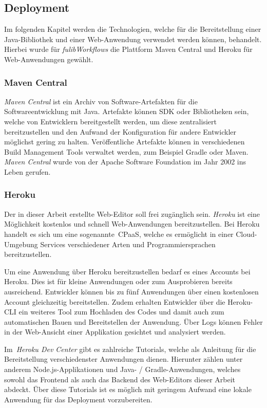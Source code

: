 \subsection{Deployment}\label{subsec:deployment}
Im folgenden Kapitel werden die Technologien, welche für die Bereitstellung einer Java-Bibliothek und einer Web-Anwendung verwendet werden können, behandelt.
Hierbei wurde für \textit{fulibWorkflows} die Plattform Maven Central und Heroku für Web-Anwendungen gewählt.

\subsubsection{Maven Central}\label{subsubsec:mavencentral}
\textit{Maven Central} ist ein Archiv von Software-Artefakten für die Softwareentwicklung mit Java.
Artefakte können \ac{SDK} oder Bibliotheken sein, welche von Entwicklern bereitgestellt werden, um diese zentralisiert bereitzustellen
und den Aufwand der Konfiguration für andere Entwickler möglichst gering zu halten.
Veröffentliche Artefakte können in verschiedenen Build Management Tools verwaltet werden, zum Beispiel Gradle oder Maven.
\textit{Maven Central} wurde von der Apache Software Foundation im Jahr 2002 ins Leben gerufen\cite*{maven}.

\subsubsection{Heroku}\label{subsubsec:heroku}
Der in dieser Arbeit erstellte Web-Editor soll frei zugänglich sein.
\textit{Heroku} ist eine Möglichkeit kostenlos und schnell Web-Anwendungen bereitzustellen.
Bei Heroku handelt es sich um eine sogenannte~\ac{CPaaS}, welche es ermöglicht in einer Cloud-Umgebung
Services verschiedener Arten und Programmiersprachen bereitzustellen\cite*{heroku}.

Um eine Anwendung über Heroku bereitzustellen bedarf es eines Accounts bei Heroku.
Dies ist für kleine Anwendungen oder zum Ausprobieren bereits ausreichend.
Entwickler können bis zu fünf Anwendungen über einen kostenlosen Account gleichzeitig bereitstellen.
Zudem erhalten Entwickler über die Heroku-CLI ein weiteres Tool zum Hochladen des Codes und damit auch zum automatischen
Bauen und Bereitstellen der Anwendung.
Über Logs können Fehler in der Web-Ansicht einer Applikation gesichtet und analysiert werden.

Im~\textit{Heroku Dev Center} gibt es zahlreiche Tutorials, welche als Anleitung für die Bereitstellung verschiedenster Anwendungen dienen.
Hierunter zählen unter anderem Node.js-Applikationen und Java- / Gradle-Anwendungen, welches sowohl das Frontend als auch das Backend
des Web-Editors dieser Arbeit abdeckt\cite*{herokuDev}.
Über diese Tutorials ist es möglich mit geringem Aufwand eine lokale Anwendung für das Deployment vorzubereiten.
